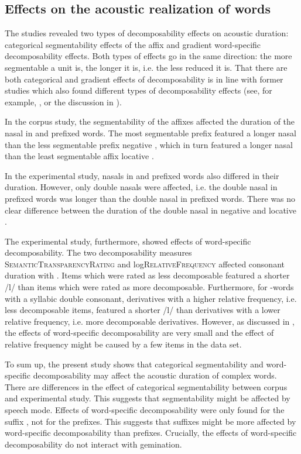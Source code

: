 \subsection{Effects on the acoustic realization of words}

The studies revealed two types of decomposability effects on acoustic duration: categorical segmentability effects of the affix and gradient word-specific decomposability effects. Both types of effects go in the same direction: the more segmentable a unit is, the  longer it is, i.e. the less reduced it is. That there are both categorical and gradient effects of decomposability is in line with former studies which also found different types of decomposability effects (see, for example, \cite{Schuppler.2012}, or the discussion in ). 

In the corpus study, the segmentability of the affixes affected the duration of the nasal in  and prefixed words. The most segmentable prefix  featured a longer nasal than the less segmentable prefix negative , which in turn featured a longer nasal than the least segmentable affix locative . 


In the experimental study, nasals in  and prefixed words also differed in their duration. However, only double nasals were affected, i.e. the double nasal in prefixed words was longer than the double nasal in prefixed words. There was no clear difference between the duration of the double nasal in negative and locative .

The experimental study, furthermore, showed effects of word-specific decomposability. The two decomposability measures \textsc{SemanticTransparencyRating} and log\textsc{RelativeFrequency} affected consonant duration with . Items which were rated as less decomposable featured a shorter /l/ than items which were rated as more decomposable. Furthermore, for -words with a syllabic double consonant, derivatives with a higher relative frequency, i.e. less decomposable items, featured a shorter /l/ than derivatives with a lower relative frequency, i.e. more decomposable derivatives. However, as discussed in , the effects of word-specific decomposability are very small and the effect of relative frequency might be caused by a few items in the data set. 


To sum up, the present study shows that categorical segmentability and word-specific decomposability may affect the acoustic duration of complex words.
 There are differences in the effect of categorical segmentability between corpus and experimental study. This suggests
that segmentability might be affected by speech mode. 
Effects of word-specific decomposability were only found for the suffix , not for the prefixes. This suggests that suffixes might be more affected by word-specific decomposability than prefixes.
 Crucially, the effects of word-specific decomposability do not interact with gemination. 




